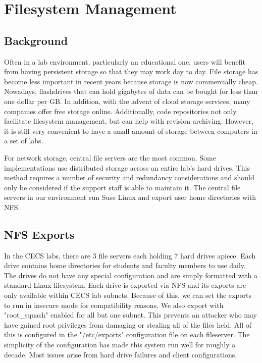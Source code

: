 \section{Filesystem Management} \label{sec:filesystem_management}
\subsection{Background}
Often in a lab environment, particularly an educational one, users will benefit from having persistent storage so that they may work day to day.   File storage has become less important in recent years because storage is now commercially cheap.  Nowadays, flashdrives that can hold gigabytes of data can be bought for less than one dollar per GB.  In addition, with the advent of cloud storage services, many companies offer free storage online.  Additionally, code repositories not only facilitate filesystem management, but can help with revision archiving.  However, it is still very convenient to have a small amount of storage between computers in a set of labs.  

For network storage, central file servers are the most common.  Some implementations use distributed storage across an entire lab's hard drives.  This method requires a number of security and redundancy considerations and should only be considered if the support staff is able to maintain it.  The central file servers in our environment run Suse Linux and export user home directories with NFS.  

\subsection{NFS Exports}
In the CECS labs, there are 3 file servers each holding 7 hard drives apiece.  Each drive contains home directories for students and faculty members to use daily.  The drives do not have any special configuration and are simply formatted with a standard Linux filesystem.  Each drive is exported via NFS and its exports are only available within CECS lab subnets.  Because of this, we can set the exports to run in insecure mode for compatibility reasons.  We also export with "root\_squash" enabled for all but one subnet.  This prevents an attacker who may have gained root privileges from damaging or stealing all of the files held.  All of this is configured in the "/etc/exports" configuration file on each fileserver.  The simplicity of the configuration has made this system run well for roughly a decade.  Most issues arise from hard drive failures and client configurations.

